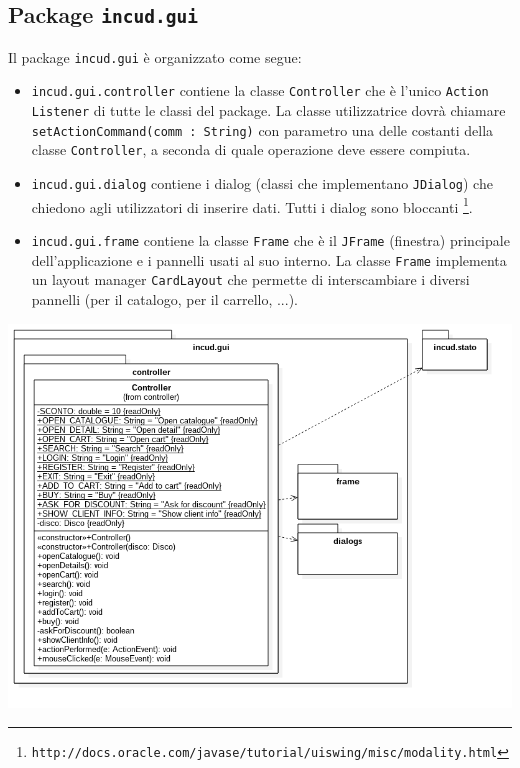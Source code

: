 \subsection{Package \texttt{incud.gui}}

Il package \texttt{incud.gui} è organizzato come segue:
\begin{itemize}
    \item \texttt{incud.gui.controller} contiene la classe \texttt{Controller} che è l'unico \texttt{Action Listener} di tutte le classi del package. La classe utilizzatrice dovrà chiamare \texttt{setActionCommand(comm : String)} con parametro una delle costanti della classe \texttt{Controller}, a seconda di quale operazione deve essere compiuta.
    \item \texttt{incud.gui.dialog} contiene i dialog (classi che implementano \texttt{JDialog}) che chiedono agli utilizzatori di inserire dati. Tutti i dialog sono bloccanti \footnote{\texttt{http://docs.oracle.com/javase/tutorial/uiswing/misc/modality.html}}.
    \item \texttt{incud.gui.frame} contiene la classe \texttt{Frame} che è il \texttt{JFrame} (finestra) principale dell'applicazione e i pannelli usati al suo interno. La classe \texttt{Frame} implementa un layout manager \texttt{CardLayout} che permette di interscambiare i diversi pannelli (per il catalogo, per il carrello, ...).
\end{itemize}

\begin{center}
    \includegraphics[width=\textwidth]{diagram/classi-gui.png}
\end{center}

